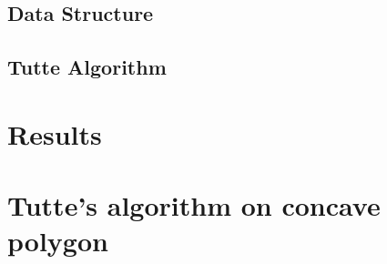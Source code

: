 \documentclass[12pt]{report}
\begin{document}
\section{Data Structure}


\section{Tutte Algorithm}


\chapter{Results}



\chapter{Tutte's algorithm on concave polygon}




\end{document}
